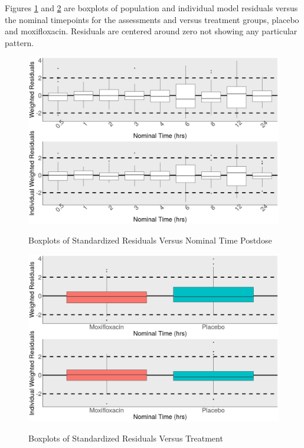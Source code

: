 \documentclass[
]{article}
\begin{document}
Figures \ref{fig:boxplots1} and \ref{fig:boxplots2} are boxplots of
population and individual model residuals versus the nominal timepoints
for the assessments and versus treatment groups, placebo and
moxifloxacin. Residuals are centered around zero not showing any
particular pattern.

\begin{figure}[H]
\caption{Boxplots of Standardized Residuals Versus Nominal Time Postdose} 
\includegraphics[width=\textwidth]{../Report/Figures/boxplots1.png}
\label{fig:boxplots1}
\end{figure}

\begin{figure}[H]
\caption{Boxplots of Standardized Residuals Versus Treatment} 
\includegraphics[width=\textwidth]{../Report/Figures/boxplots2.png}
\label{fig:boxplots2}
\end{figure}
\end{document}

